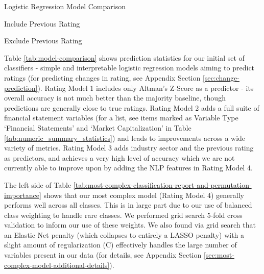 \documentclass{article}[11pt]
\begin{document}
    \begin{table}[h!]
        \centering
        \caption{Logistic Regression Model Comparison}
        \begin{minipage}[c]{0.45\linewidth}
            \centering
            \caption{\footnotesize Include Previous Rating} 
            
        \end{minipage}
        \begin{minipage}[c]{0.45\linewidth}
            \centering
            \caption{\footnotesize Exclude Previous Rating} 
            
        \end{minipage}
        \label{tab:logistic-regression-model-comparison}
    \end{table}

    Table \ref{tab:model-comparison} shows prediction statistics for our initial set of classifiers - simple and interpretable logistic regression models aiming to predict ratings (for predicting changes in rating, see Appendix Section \ref{sec:change-prediction}). Rating Model 1 includes only Altman's Z-Score as a predictor - its overall accuracy is not much better than the majority baseline, though predictions are generally close to true ratings. Rating Model 2 adds a full suite of financial statement variables (for a list, see items marked as Variable Type `Financial Statements' and `Market Capitalization' in Table \ref{tab:numeric_summary_statistics}) and leads to improvements across a wide variety of metrics. Rating Model 3 adds industry sector and the previous rating as predictors, and achieves a very high level of accuracy which we are not currently able to improve upon by adding the NLP features in Rating Model 4.

    The left side of Table \ref{tab:most-complex-classification-report-and-permutation-importance} shows that our most complex model (Rating Model 4) generally performs well across all classes. This is in large part due to our use of balanced class weighting to handle rare classes. We performed grid search 5-fold cross validation to inform our use of these weights. We also found via grid search that an Elastic Net penalty (which collapses to entirely a LASSO penalty) with a slight amount of regularization (C) effectively handles the large number of variables present in our data (for details, see Appendix Section \ref{sec:most-complex-model-additional-details}). 
    
\end{document}
